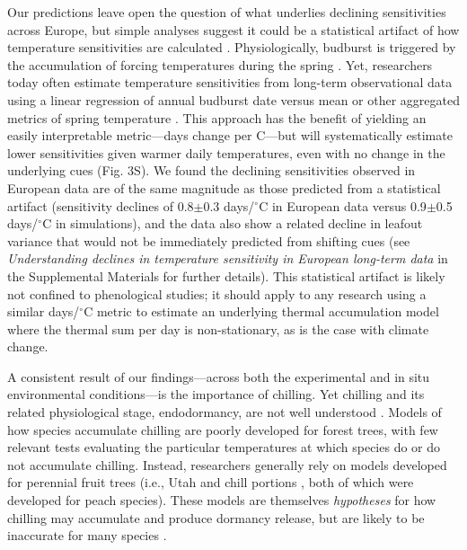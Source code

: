 \documentclass{article}
\begin{document}
\par Our predictions leave open the question of what underlies declining sensitivities across Europe, but simple analyses suggest it could be a statistical artifact of how temperature sensitivities are calculated \citep{vitasse2018,gusewell2017}. Physiologically, budburst is triggered by the accumulation of forcing temperatures during the spring \citep{hanninen1995,chuine2016}. Yet, researchers today often estimate temperature sensitivities from long-term observational data using a linear regression of annual budburst date versus mean or other aggregated metrics of spring temperature \citep[e.g.,][]{Wolkovich:2012n}. This approach has the benefit of yielding an easily interpretable metric---days change per \degree C---but will systematically estimate lower sensitivities given warmer daily temperatures, even with no change in the underlying cues (Fig. 3S). We found the declining sensitivities observed in European data are of the same magnitude as those predicted from a statistical artifact (sensitivity declines of 0.8$\pm$0.3 days/$^{\circ}$C in European data versus 0.9$\pm$0.5 days/$^{\circ}$C in simulations), and the data also show a related decline in leafout variance that would not be immediately predicted from shifting cues (see \emph{Understanding declines in temperature sensitivity in European long-term data} in the Supplemental Materials for further details). This statistical artifact is likely not confined to phenological studies; it should apply to any research using a similar days/$^{\circ}$C metric to estimate an underlying thermal accumulation model where the thermal sum per day is non-stationary, as is the case with climate change. 

\par A consistent result of our findings---across both the experimental and in situ environmental conditions---is the importance of chilling. Yet chilling and its related physiological stage, endodormancy, are not well understood \citep{chuine2016}. Models of how species accumulate chilling are poorly developed for forest trees, with few relevant tests evaluating the particular temperatures at which species do or do not accumulate chilling. Instead, researchers generally rely on models developed for perennial fruit trees (i.e., Utah \citep{richardson1974} and chill portions \citep{fishman1987}, both of which were developed for peach species). These models are themselves \emph{hypotheses} for how chilling may accumulate and produce dormancy release, but are likely to be inaccurate for many species \citep{dennis2003}. 
\end{document}
